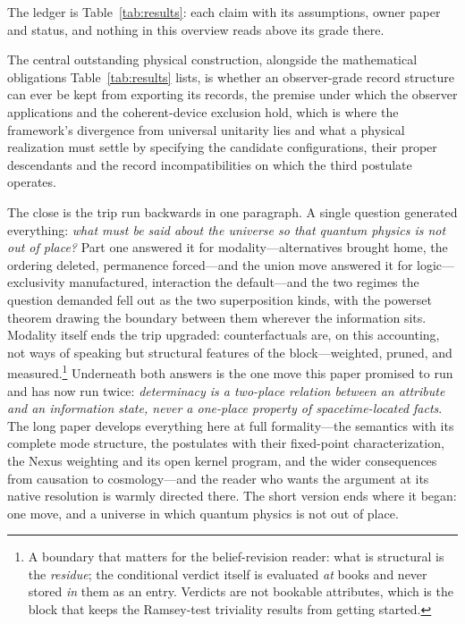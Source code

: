 \documentclass[11pt]{article}
\theoremstyle{definition}
\begin{document}
The ledger is Table~\ref{tab:results}: each claim with its assumptions, owner paper and status, and nothing in this overview reads above its grade there.

\noindent The central outstanding physical construction, alongside the mathematical obligations Table~\ref{tab:results} lists, is whether an observer-grade record structure can ever be kept from exporting its records, the premise under which the observer applications and the coherent-device exclusion hold, which is where the framework's divergence from universal unitarity lies and what a physical realization must settle by specifying the candidate configurations, their proper descendants and the record incompatibilities on which the third postulate operates.

The close is the trip run backwards in one paragraph. A single question generated everything: \emph{what must be said about the universe so that quantum physics is not out of place?} Part one answered it for modality---alternatives brought home, the ordering deleted, permanence forced---and the union move answered it for logic---exclusivity manufactured, interaction the default---and the two regimes the question demanded fell out as the two superposition kinds, with the powerset theorem drawing the boundary between them wherever the information sits. Modality itself ends the trip upgraded: counterfactuals are, on this accounting, not ways of speaking but structural features of the block---weighted, pruned, and measured.\footnote{A boundary that matters for the belief-revision reader: what is structural is the \emph{residue}; the conditional verdict itself is evaluated \emph{at} books and never stored \emph{in} them as an entry. Verdicts are not bookable attributes, which is the block that keeps the Ramsey-test triviality results \cite{gardenfors1986belief} from getting started.} Underneath both answers is the one move this paper promised to run and has now run twice: \emph{determinacy is a two-place relation between an attribute and an information state, never a one-place property of spacetime-located facts}. The long paper \cite{Aethus} develops everything here at full formality---the semantics with its complete mode structure, the postulates with their fixed-point characterization, the Nexus weighting and its open kernel program, and the wider consequences from causation to cosmology---and the reader who wants the argument at its native resolution is warmly directed there. The short version ends where it began: one move, and a universe in which quantum physics is not out of place.
\end{document}
